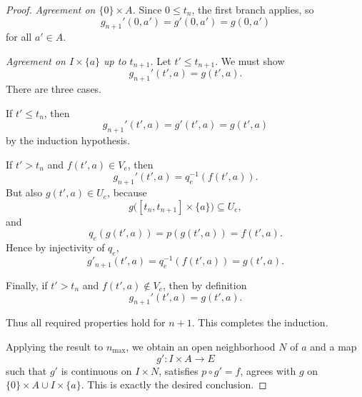 \documentclass{article}
\begin{document}
\begin{proof}
\medskip

\noindent\emph{Agreement on \(\{0\}\times A\).}
Since \(0 \le t_n\), the first branch applies, so
\[
g_{n+1}'(0,a') = g'(0,a') = g(0,a')
\]
for all \(a' \in A\).

\medskip

\noindent\emph{Agreement on \(I\times\{a\}\) up to \(t_{n+1}\).}
Let \(t' \le t_{n+1}\). We must show
\[
g_{n+1}'(t',a)=g(t',a).
\]
There are three cases.

If \(t' \le t_n\), then
\[
g_{n+1}'(t',a)=g'(t',a)=g(t',a)
\]
by the induction hypothesis.

If \(t'>t_n\) and \(f(t',a)\in V_e\), then
\[
g_{n+1}'(t',a)=q_e^{-1}(f(t',a)).
\]
But also \(g(t',a)\in U_e\), because
\[
g\bigl([t_n,t_{n+1}] \times \{a\}\bigr)\subseteq U_e,
\]
and
\[
q_e(g(t',a)) = p(g(t',a)) = f(t',a).
\]
Hence by injectivity of \(q_e\),
\[
g'_{n+1}(t',a)=q_e^{-1}(f(t',a))=g(t',a).
\]

Finally, if \(t'>t_n\) and \(f(t',a)\notin V_e\), then by definition
\[
g_{n+1}'(t',a)=g(t',a).
\]

Thus all required properties hold for \(n+1\). This completes the induction.

Applying the result to \(n_{\max}\), we obtain an open neighborhood \(N\) of \(a\) and a map
\[
g' : I \times A \to E
\]
such that \(g'\) is continuous on \(I\times N\), satisfies \(p\circ g'=f\), agrees with \(g\) on \(\{0\}\times A \cup I\times\{a\}\). This is exactly the desired conclusion.
\end{proof}
\end{document}
